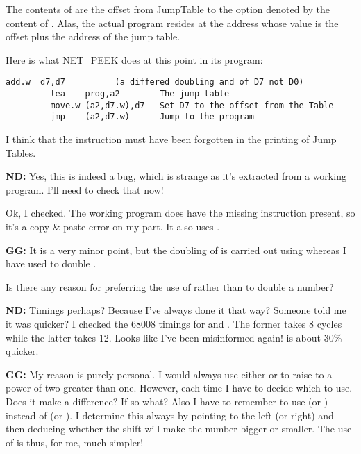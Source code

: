 The contents of  are the offset from JumpTable to the option denoted by the content of . Alas, the actual program resides at the address whose value is the offset plus the address of the jump table.

Here is what NET\_PEEK does at this point in its program:

\begin{lstlisting}[firstnumber=1,caption={NET\_PEEK Code Extract}]
         add.w  d7,d7          (a differed doubling and of D7 not D0)
         lea    prog,a2        The jump table
         move.w (a2,d7.w),d7   Set D7 to the offset from the Table
         jmp    (a2,d7.w)      Jump to the program
\end{lstlisting}


I think that the instruction  must have been forgotten in the printing of Jump Tables.

\textbf{ND: }Yes, this is indeed a bug, which is strange as it's extracted from a working program. I'll need to check that now!

Ok, I checked. The working program does have the missing instruction present, so it's a copy \& paste error on my part. It also uses .

\textbf{GG: }It is a very minor point, but the doubling of  is carried out using  whereas I have used  to double .

Is there any reason for preferring the use of  rather than  to double a number? 

\textbf{ND: }Timings perhaps? Because I've always done it that way? Someone told me it was quicker? I checked the 68008 timings for  and . The former takes 8 cycles while the latter takes 12. Looks like I've been misinformed again!  is about 30\% quicker.

\textbf{GG: }My reason is purely personal. I would always use either  or  to raise to a power of two greater than one. However, each time I have to decide which to use. Does it make a difference? If so what? Also I have to remember to use  (or ) instead of  (or ). I determine this always by pointing to the left (or right) and then deducing whether the shift will make the number bigger or smaller. The use of  is thus, for me, much simpler!

